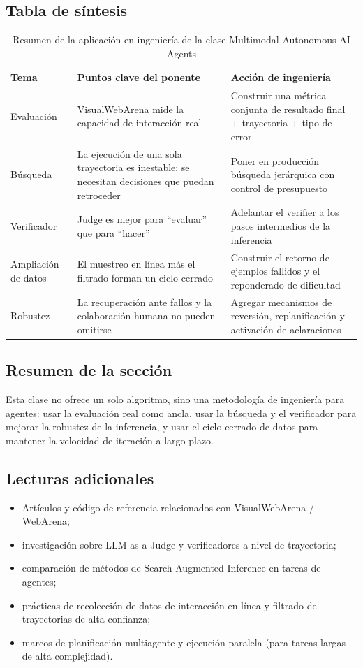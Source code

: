 \documentclass[a4paper]{article}
\begin{document}
\subsection{Tabla de síntesis}
\begin{table}[H]
\centering
\small
\begin{tabular}{p{2.6cm}p{3.9cm}p{4.3cm}}
\toprule
\textbf{Tema} & \textbf{Puntos clave del ponente} & \textbf{Acción de ingeniería} \\
\midrule
Evaluación & VisualWebArena mide la capacidad de interacción real & Construir una métrica conjunta de resultado final + trayectoria + tipo de error \\
Búsqueda & La ejecución de una sola trayectoria es inestable; se necesitan decisiones que puedan retroceder & Poner en producción búsqueda jerárquica con control de presupuesto \\
Verificador & Judge es mejor para ``evaluar'' que para ``hacer'' & Adelantar el verifier a los pasos intermedios de la inferencia \\
Ampliación de datos & El muestreo en línea más el filtrado forman un ciclo cerrado & Construir el retorno de ejemplos fallidos y el reponderado de dificultad \\
Robustez & La recuperación ante fallos y la colaboración humana no pueden omitirse & Agregar mecanismos de reversión, replanificación y activación de aclaraciones \\
\bottomrule
\end{tabular}
\caption{Resumen de la aplicación en ingeniería de la clase Multimodal Autonomous AI Agents}
\end{table}

\subsection{Resumen de la sección}
Esta clase no ofrece un solo algoritmo, sino una metodología de ingeniería para agentes: usar la evaluación real como ancla, usar la búsqueda y el verificador para mejorar la robustez de la inferencia, y usar el ciclo cerrado de datos para mantener la velocidad de iteración a largo plazo.

\subsection{Lecturas adicionales}
\begin{itemize}
    \item Artículos y código de referencia relacionados con VisualWebArena / WebArena;
    \item investigación sobre LLM-as-a-Judge y verificadores a nivel de trayectoria;
    \item comparación de métodos de Search-Augmented Inference en tareas de agentes;
    \item prácticas de recolección de datos de interacción en línea y filtrado de trayectorias de alta confianza;
    \item marcos de planificación multiagente y ejecución paralela (para tareas largas de alta complejidad).
\end{itemize}
\end{document}
